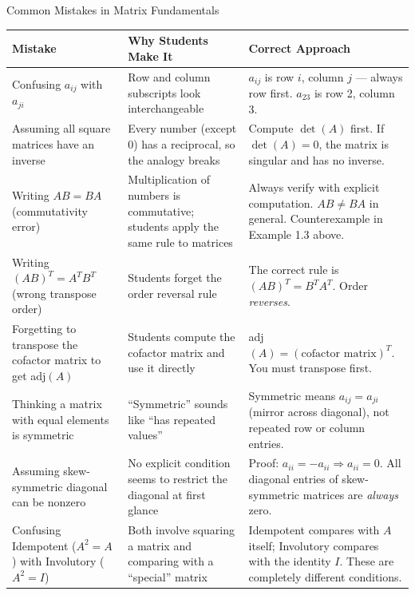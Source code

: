 \documentclass[12pt,a4paper]{article}
\begin{document}
\begin{mistakebox}{Common Mistakes in Matrix Fundamentals}
\begin{tabular}{@{}p{3.5cm}p{5cm}p{6cm}@{}}
\toprule
\textbf{Mistake} & \textbf{Why Students Make It} & \textbf{Correct Approach} \\
\midrule
Confusing $a_{ij}$ with $a_{ji}$ & Row and column subscripts look interchangeable & $a_{ij}$ is row $i$, column $j$ --- always row first. $a_{23}$ is row 2, column 3. \\
\addlinespace
Assuming all square matrices have an inverse & Every number (except 0) has a reciprocal, so the analogy breaks & Compute $\det(A)$ first. If $\det(A) = 0$, the matrix is singular and has no inverse. \\
\addlinespace
Writing $AB = BA$ (commutativity error) & Multiplication of numbers is commutative; students apply the same rule to matrices & Always verify with explicit computation. $AB \neq BA$ in general. Counterexample in Example 1.3 above. \\
\addlinespace
Writing $(AB)^T = A^T B^T$ (wrong transpose order) & Students forget the order reversal rule & The correct rule is $(AB)^T = B^T A^T$. Order \emph{reverses}. \\
\addlinespace
Forgetting to transpose the cofactor matrix to get adj$(A)$ & Students compute the cofactor matrix and use it directly & adj$(A) = (\text{cofactor matrix})^T$. You must transpose first. \\
\addlinespace
Thinking a matrix with equal elements is symmetric & ``Symmetric'' sounds like ``has repeated values'' & Symmetric means $a_{ij} = a_{ji}$ (mirror across diagonal), not repeated row or column entries. \\
\addlinespace
Assuming skew-symmetric diagonal can be nonzero & No explicit condition seems to restrict the diagonal at first glance & Proof: $a_{ii} = -a_{ii} \Rightarrow a_{ii} = 0$. All diagonal entries of skew-symmetric matrices are \emph{always} zero. \\
\addlinespace
Confusing Idempotent ($A^2 = A$) with Involutory ($A^2 = I$) & Both involve squaring a matrix and comparing with a ``special'' matrix & Idempotent compares with $A$ itself; Involutory compares with the identity $I$. These are completely different conditions. \\
\bottomrule
\end{tabular}
\end{mistakebox}

\end{document}

